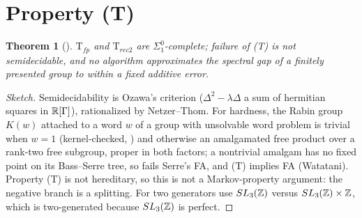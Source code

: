 \documentclass[11pt]{article}
\newtheorem{theorem}{Theorem}[section]
\theoremstyle{definition}
\newcommand{\Sio}{\Sigma^0_1}\newcommand{\Pio}{\Pi^0_1}
\begin{document}
\section{Property (T)}
\begin{theorem}[]
$\mathrm T_{fp}$ and $\mathrm T_{rec2}$ are $\Sio$-complete; failure of (T) is not semidecidable, and no algorithm approximates the spectral gap of a finitely presented group to within a fixed additive error.
\end{theorem}
\begin{proof}[Sketch]
Semidecidability is Ozawa's criterion ($\Delta^2-\lambda\Delta$ a sum of hermitian squares in $\mathbb R[\Gamma]$), rationalized by Netzer--Thom. For hardness, the Rabin group $K(w)$ attached to a word $w$ of a group with unsolvable word problem is trivial when $w=1$ (kernel-checked, ) and otherwise an amalgamated free product over a rank-two free subgroup, proper in both factors; a nontrivial amalgam has no fixed point on its Bass--Serre tree, so fails Serre's FA, and (T) implies FA (Watatani). Property (T) is not hereditary, so this is not a Markov-property argument: the negative branch is a splitting. For two generators use $SL_3(\mathbb Z)$ versus $SL_3(\mathbb Z)\times\mathbb Z$, which is two-generated because $SL_3(\mathbb Z)$ is perfect.
\end{proof}
\end{document}
